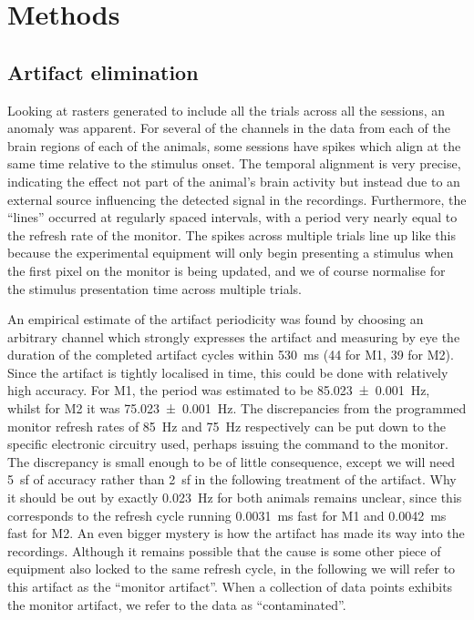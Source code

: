 \section{Methods}


\FloatBarrier
\subsection{Artifact elimination}
\label{sec:ma}

Looking at rasters generated to include all the trials across all the sessions, an anomaly was apparent.
For several of the channels in the data from each of the brain regions of each of the animals, some sessions have spikes which align at the same time relative to the stimulus onset.
The temporal alignment is very precise, indicating the effect not part of the animal's brain activity but instead due to an external source influencing the detected signal in the recordings.
Furthermore, the ``lines'' occurred at regularly spaced intervals, with a period very nearly equal to the refresh rate of the monitor.
The spikes across multiple trials line up like this because the experimental equipment will only begin presenting a stimulus when the first pixel on the monitor is being updated, and we of course normalise for the stimulus presentation time across multiple trials.

An empirical estimate of the artifact periodicity was found by choosing an arbitrary channel which strongly expresses the artifact and measuring by eye the duration of the completed artifact cycles within \SI{530}{ms} (44 for \ac{M1}, 39 for \ac{M2}).
Since the artifact is tightly localised in time, this could be done with relatively high accuracy.
For \ac{M1}, the period was estimated to be \SI{85.023(1)}{Hz}, whilst for \ac{M2} it was \SI{75.023(1)}{Hz}.
The discrepancies from the programmed monitor refresh rates of \SI{85}{Hz} and \SI{75}{Hz} respectively can be put down to the specific electronic circuitry used, perhaps issuing the command to the monitor.
The discrepancy is small enough to be of little consequence, except we will need \SI{5}{sf} of accuracy rather than \SI{2}{sf} in the following treatment of the artifact.
Why it should be out by exactly \SI{0.023}{Hz} for both animals remains unclear, since this corresponds to the refresh cycle running \SI{0.0031}{ms} fast for \ac{M1} and \SI{0.0042}{ms} fast for \ac{M2}.
An even bigger mystery is how the artifact has made its way into the recordings.
Although it remains possible that the cause is some other piece of equipment also locked to the same refresh cycle, in the following we will refer to this artifact as the ``monitor artifact''.
When a collection of data points exhibits the monitor artifact, we refer to the data as ``contaminated''.

